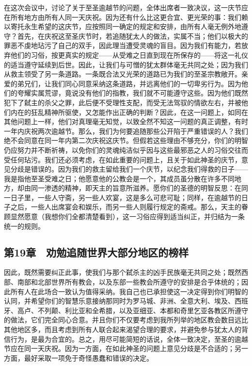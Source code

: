 在这次会议中，讨论了关于至圣逾越节的问题，全体出席者一致决议，这一庆节应在所有地方由所有人同一天庆祝。因为还有什么比这更合宜、更光荣的事：我们赖以寄托永生希望的这庆节，应按照同一确定的规定和安排，由所有人毫无例外地遵守？首先，在庆祝这至圣庆节时，若追随犹太人的做法，实属不当；他们以极大的罪恶不虔地玷污了自己的双手，因此理当遭受灵魂的盲目。因为我们有能力，若放弃他们的习俗，按更真实的规定——从受难之日直到现在所保存的——将这一礼仪的适当遵守延续到后世。因此，让我们与可憎的犹太群体毫无共同之处；因为我们从救主领受了另一条道路。一条既合法又光荣的道路已为我们的至圣宗教敞开。亲爱的弟兄们，让我们同心同意采纳这条道路，并远离他们的一切卑劣行为。因为他们的夸耀实属荒谬，竟说没有他们的指教，我们就不可能遵守这些。因为他们既然犯下了弑主的杀父之罪，此后便不受理性支配，而受无法驾驭的情欲左右，并被他们内在的狂乱精神所驱使，又怎能作出正确的判断？因此，在这一问题上，如同在其他问题上一样，他们对真理毫无知觉，以致全然不知这一问题的真正调整，有时一年内庆祝两次逾越节。那么，我们为何要追随那些公开陷于严重错误的人？我们绝不会同意在同一年内第二次庆祝这庆节。但假若这些理由不够充分，你们的明智仍应努力并不断祈祷，以免你们的灵魂纯洁似乎因与这些最邪恶之人的习俗交往而受任何玷污。我们还必须考虑，在如此重要的问题上，且关于如此神圣的庆节，意见分歧是错误的。因为我们的救主留给我们一个庆节，以纪念我们得救的日子——我是指他至圣受难之日；他愿意他的公教会是一个，其成员虽分散在许多不同地方，却由同一渗透的精神，即天主的旨意所滋养。愿你们的圣德的明智反思：在同一日子里，一些人守斋，另一些人欢宴，这是多么可悲可耻；同样，在逾越节的日子之后，一些人出席宴会和娱乐，而另一些人则履行规定的斋戒。那么，天主的眷顾显然愿意（我想你们全都清楚看到），这一习俗应得到适当纠正，并归结为一条统一的规则。\par


\subsection{第19章　劝勉追随世界大部分地区的榜样}

因此，既然需要纠正此事，使我们与那个弑杀主的凶手民族毫无共同之处；既然西部、南部和北部世界所有教会，以及东部一些教会所遵守的安排是合乎体统的；因此所有人在此场合一致认为值得采纳。我自己也已承担使这一决定得到你们明智的认同，并希望你们的智慧乐意接纳那同时为罗马城、非洲、全意大利、埃及、西班牙、高卢、不列颠、利比亚和全希腊，以及亚细亚、本都和奇里乞亚各教区所遵守的做法，它们完全同心合意。并且你们不仅要考虑到我所列举的地区教会数目远比其他地区多，而且考虑到所有人联合起来渴望合理的要求，并避免参与犹太人的背信行为，是最为合宜的。总之，用尽可能简短的话说，全体一致决定，至圣的逾越节应在同一天庆祝。因为一方面，在如此神圣的问题上意见分歧是不合适的；另一方面，最好采取一项免于奇怪愚蠢和错误的决定。\par

